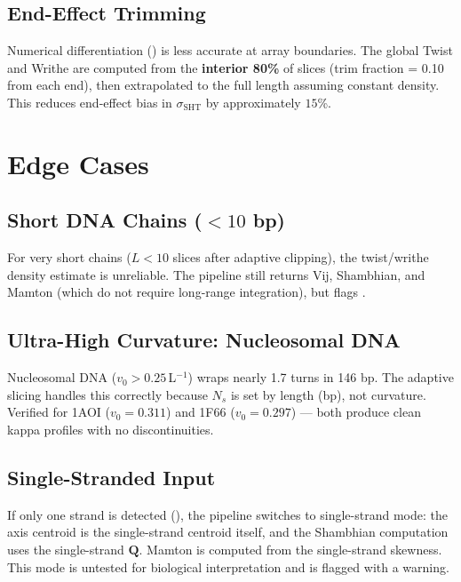\subsection{End-Effect Trimming}

Numerical differentiation () is less accurate at array boundaries. The global Twist and Writhe are computed from the \textbf{interior 80\%} of slices (trim fraction = 0.10 from each end), then extrapolated to the full length assuming constant density. This reduces end-effect bias in $\sigma_{\mathrm{SHT}}$ by approximately $15$\%.

\section{Edge Cases}

\subsection{Short DNA Chains ($< 10$ bp)}

For very short chains ($L < 10$ slices after adaptive clipping), the twist/writhe density estimate is unreliable. The pipeline still returns Vij, Shambhian, and Mamton (which do not require long-range integration), but flags .

\subsection{Ultra-High Curvature: Nucleosomal DNA}

Nucleosomal DNA ($v_0 > 0.25$\,L$^{-1}$) wraps nearly 1.7 turns in 146 bp. The adaptive slicing handles this correctly because $N_s$ is set by length (bp), not curvature. Verified for 1AOI ($v_0 = 0.311$) and 1F66 ($v_0 = 0.297$) --- both produce clean kappa profiles with no discontinuities.

\subsection{Single-Stranded Input}

If only one strand is detected (), the pipeline switches to single-strand mode: the axis centroid is the single-strand centroid itself, and the Shambhian computation uses the single-strand $\mathbf{Q}$. Mamton is computed from the single-strand skewness. This mode is untested for biological interpretation and is flagged with a warning.

